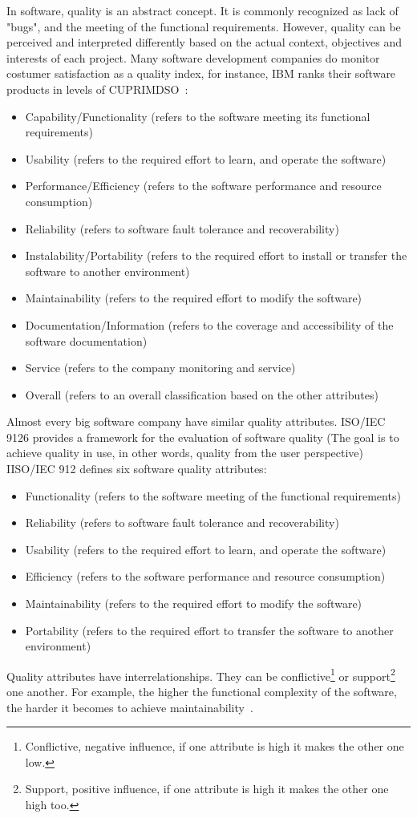 In software, quality is an abstract concept. It is commonly recognized as lack of "bugs", and the meeting of the functional requirements.
However, quality can be perceived and interpreted differently based on the actual context, objectives and interests of each project.
Many software development companies do monitor costumer satisfaction as a quality index,
for instance, IBM ranks their software products in levels of CUPRIMDSO~\cite{kan2002metrics}:
\begin{itemize}
\item Capability/Functionality (refers to the software meeting its functional requirements)
\item Usability (refers to the required effort to learn, and operate the software)
\item Performance/Efficiency (refers to the software performance and resource consumption)
\item Reliability (refers to software fault tolerance and recoverability)
\item Instalability/Portability (refers to the required effort to install or transfer the software to another environment)
\item Maintainability (refers to the required effort to modify the software)
\item Documentation/Information (refers to the coverage and accessibility of the software documentation)
\item Service (refers to the company monitoring and service)
\item Overall (refers to an overall classification based on the other attributes)
\end{itemize}
Almost every big software company have similar quality attributes.
ISO/IEC 9126 provides a framework for the evaluation of software quality (The goal is to achieve quality in use, in other words, quality from the user perspective)~\cite{bevan1999quality}
IISO/IEC 912 defines six software quality attributes:
\begin{itemize}
\item Functionality (refers to the software meeting of the functional requirements)
\item Reliability (refers to software fault tolerance and recoverability)
\item Usability (refers to the required effort to learn, and operate the software)
\item Efficiency (refers to the software performance and resource consumption)
\item Maintainability (refers to the required effort to modify the software)
\item Portability (refers to the required effort to transfer the software to another environment)
\end{itemize}
Quality attributes have interrelationships.
They can be
conflictive\footnote{Conflictive, negative influence, if one attribute is high it makes the other one low.} or
support\footnote{Support, positive influence, if one attribute is high it makes the other one high too.} one another.
For example, the higher the functional complexity of the software, the harder it becomes to achieve maintainability~\cite{kan2002metrics}.

